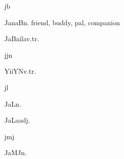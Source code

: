 \begin{multicols*}{2}
\begin{dictroot}{j}{b}
\begin{dictentry}{JanaB}{n.}
{            friend, buddy, pal, companion
        }
    \end{dictentry}
    \begin{dictentry}{JaBaila}{v.tr.}\label{word:JaBaila}
    \end{dictentry}
\end{dictroot}

\begin{dictroot}{j}{jn}{\label{root:J_JN}}
    \begin{dictentry}{YiiYN}{v.tr.}\label{wor:YiiYN}
    \end{dictentry}
\end{dictroot}

\begin{dictroot}{j}{l}\label{root:J_L}
    \begin{dictentry}{JaL}{n.}\label{word:JaL}
    \end{dictentry}
    \begin{dictentry}{JaLa}{adj.}\label{word:JaLa}
    \end{dictentry}
\end{dictroot}

\begin{dictroot}{j}{mj}\label{root:J_MJ}
    \begin{dictentry}{JaMJ}{n.}\label{word:JaMJ}
    \end{dictentry}
\end{dictroot}


\end{multicols*}
